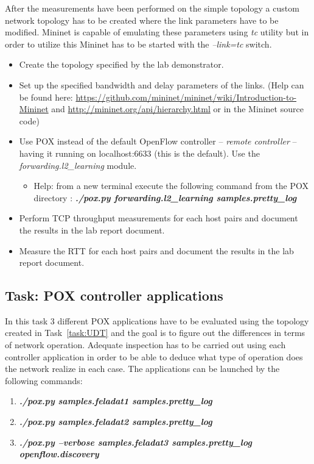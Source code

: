 \documentclass[a4paper]{article}
\begin{document}
After the measurements have been performed on the simple topology a custom network topology has to be created where the
link
parameters have to be modified. Mininet is capable of emulating these parameters using \emph{tc} utility but in order
to utilize this Mininet has to be started with the \emph{--link=tc} switch.
\begin{itemize}
    \item Create the topology specified by the lab demonstrator.
    \item Set up the specified bandwidth and delay parameters of the links. (Help can be found here:
          \url{https://github.com/mininet/mininet/wiki/Introduction-to-Mininet} and
          \url{http://mininet.org/api/hierarchy.html}
          or in the Mininet source code)
    \item Use POX instead of the default OpenFlow controller -- \emph{remote controller} -- having it running on
          localhost:6633 (this is the default). Use the \emph{forwarding.l2\_learning} module.
          \begin{itemize}
              \item Help: from a new terminal execute the following command from the POX directory :
                    \emph{\textbf{./pox.py
                            forwarding.l2\_learning samples.pretty\_log}}
          \end{itemize}
    \item Perform TCP throughput measurements for each host pairs and document the results in the lab report document.
    \item Measure the RTT for each host pairs and document the results in the lab report document.

\end{itemize}

\subsection{Task: POX controller applications}

In this task 3 different POX applications have to be evaluated using the topology created in Task~\ref{task:UDT} and
the
goal is to figure out the differences in terms of network operation. Adequate inspection has to be carried out using
each controller application in order to be able to deduce what type of operation does the network realize in each case.
The applications can be launched by the following commands:
\begin{enumerate}
    \item \emph{\textbf{./pox.py samples.feladat1 samples.pretty\_log}}
    \item \emph{\textbf{./pox.py samples.feladat2 samples.pretty\_log}}
    \item \emph{\textbf{./pox.py --verbose samples.feladat3 samples.pretty\_log openflow.discovery }}
\end{enumerate}
\end{document}
